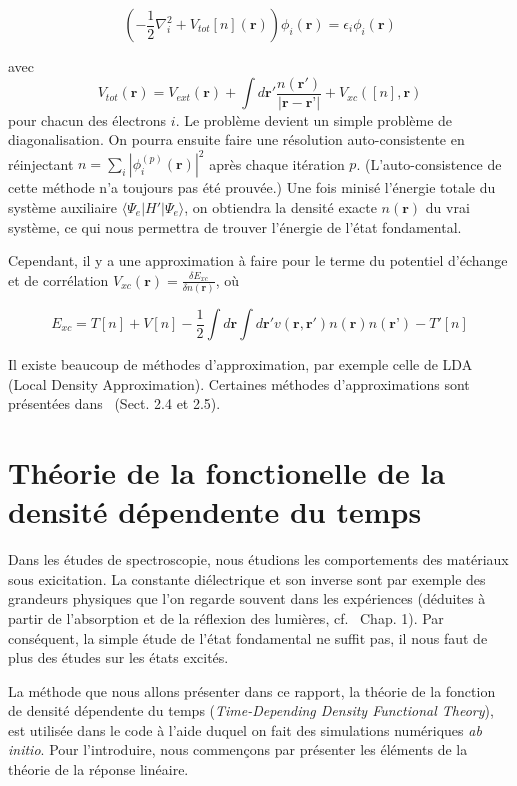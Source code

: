 \documentclass[12pt, french]{report}
\theoremstyle{theoreme}
\begin{document}
$$
(-\frac{1}{2}\nabla_i^2 + V_{tot}[n](\textbf{r}))\phi_i(\textbf{r}) = \epsilon_i \phi_i (\textbf{r})
$$

avec
$$
V_{tot}(\textbf{r}) = V_{ext}(\textbf{r}) + \int d\textbf{r}' \frac{n(\textbf{r}')}{|\textbf{r} - \textbf{r'}|} + V_{xc}([n], \textbf{r})
$$
pour chacun des électrons $i$. Le problème devient un simple problème de diagonalisation. On pourra ensuite faire une résolution auto-consistente en réinjectant $n = \sum_i |\phi_i^{(p)}(\textbf{r})|^2 $ après chaque itération $p$. (L'auto-consistence de cette méthode n'a toujours pas été prouvée.) Une fois minisé l'énergie totale du système auxiliaire $\langle \Psi_e | H' | \Psi_e \rangle $, on obtiendra la densité exacte $n(\textbf{r})$ du vrai système, ce qui nous permettra de trouver l'énergie de l'état fondamental.

Cependant, il y a une approximation à faire pour le terme du potentiel d'échange et de corrélation $V_{xc}(\textbf{r}) = \frac{\delta E_{xc}}{\delta n(\textbf{r})}$, où

$$
E_{xc} = T[n] + V[n] - \frac{1}{2}\int d\textbf{r} \int d\textbf{r}' v(\textbf{r}, \textbf{r}') n(\textbf{r}) n(\textbf{r'}) - T'[n]
$$

Il existe beaucoup de méthodes d'approximation, par exemple celle de LDA (Local Density Approximation). Certaines méthodes d'approximations sont présentées dans~\cite{Sot03} (Sect. 2.4 et 2.5).

\section{Théorie de la fonctionelle de la densité dépendente du temps}\label{TDDFT}
Dans les études de spectroscopie, nous étudions les comportements des matériaux sous exicitation. La constante diélectrique et son inverse sont par exemple des grandeurs physiques que l'on regarde souvent dans les expériences (déduites à partir de l'absorption et de la réflexion des lumières, cf.~\cite{Sot03} Chap. 1). Par conséquent, la simple étude de l'état fondamental ne suffit pas, il nous faut de plus des études sur les états excités.

La méthode que nous allons présenter dans ce rapport, la théorie de la fonction de densité dépendente du temps (\textit{Time-Depending Density Functional Theory}), est utilisée dans le code à l'aide duquel on fait des simulations numériques \textit{ab initio}. Pour l'introduire, nous commençons par présenter les éléments de la théorie de la réponse linéaire.
\end{document}
